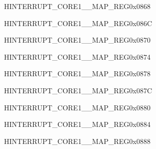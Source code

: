 \begin{register}{H}{INTERRUPT\_CORE1\_\_MAP\_REG}{0x0868}\label{regdesc:INTERRUPTCORE1I2S1INTMAPREG}
\end{register}
\vspace{-3em}

\begin{register}{H}{INTERRUPT\_CORE1\_\_MAP\_REG}{0x086C}\label{regdesc:INTERRUPTCORE1UARTINTRMAPREG}
\end{register}
\vspace{-3em}

\begin{register}{H}{INTERRUPT\_CORE1\_\_MAP\_REG}{0x0870}\label{regdesc:INTERRUPTCORE1UART1INTRMAPREG}
\end{register}
\vspace{-3em}

\begin{register}{H}{INTERRUPT\_CORE1\_\_MAP\_REG}{0x0874}\label{regdesc:INTERRUPTCORE1UART2INTRMAPREG}
\end{register}
\vspace{-3em}

\begin{register}{H}{INTERRUPT\_CORE1\_\_MAP\_REG}{0x0878}\label{regdesc:INTERRUPTCORE1SDIOHOSTINTERRUPTMAPREG}
\end{register}
\vspace{-3em}

\begin{register}{H}{INTERRUPT\_CORE1\_\_MAP\_REG}{0x087C}\label{regdesc:INTERRUPTCORE1PWM0INTRMAPREG}
\end{register}
\vspace{-3em}

\begin{register}{H}{INTERRUPT\_CORE1\_\_MAP\_REG}{0x0880}\label{regdesc:INTERRUPTCORE1PWM1INTRMAPREG}
\end{register}
\vspace{-3em}

\begin{register}{H}{INTERRUPT\_CORE1\_\_MAP\_REG}{0x0884}\label{regdesc:INTERRUPTCORE1PWM2INTRMAPREG}
\end{register}
\vspace{-3em}

\begin{register}{H}{INTERRUPT\_CORE1\_\_MAP\_REG}{0x0888}\label{regdesc:INTERRUPTCORE1PWM3INTRMAPREG}
\end{register}
\vspace{-3em}

